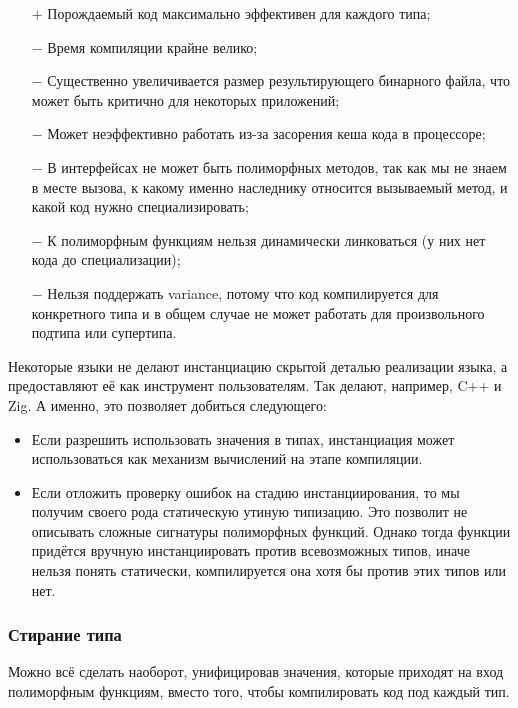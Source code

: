 \documentclass[12pt]{article}
\newcommand{\positive}{$+$} %
\newcommand{\negative}{{\color{red} $-$}} %
\begin{document}
    \begin{itemize}
        \item[\positive] Порождаемый код максимально эффективен для каждого типа;
        \item[\negative] Время компиляции крайне велико;
        \item[\negative] Существенно увеличивается размер результирующего бинарного файла, что может быть критично для некоторых приложений;
        \item[\negative] Может неэффективно работать из-за засорения кеша кода в процессоре;
        \item[\negative] В интерфейсах не может быть полиморфных методов, так как мы не знаем в месте вызова, к какому именно наследнику относится вызываемый метод, и какой код нужно специализировать;
        \item[\negative] К полиморфным функциям нельзя динамически линковаться (у них нет кода до специализации);
        \item[\negative] Нельзя поддержать variance, потому что код компилируется для конкретного типа и в общем случае не может работать для произвольного подтипа или супертипа.
    \end{itemize}

    Некоторые языки не делают инстанциацию скрытой деталью реализации языка, а предоставляют её как инструмент пользователям.
    Так делают, например, C++ и Zig.
    А именно, это позволяет добиться следующего:
    \begin{itemize}
        \item Если разрешить использовать значения в типах, инстанциация может использоваться как механизм вычислений на этапе компиляции.
        \item Если отложить проверку ошибок на стадию инстанциирования, то мы получим своего рода статическую утиную типизацию.
        Это позволит не описывать сложные сигнатуры полиморфных функций.
        Однако тогда функции придётся вручную инстанциировать против всевозможных типов, иначе нельзя понять статически, компилируется она хотя бы против этих типов или нет.
    \end{itemize}

    \subsubsection{Стирание типа} \label{subsubsec:type-erasure}

    Можно всё сделать наоборот, унифицировав значения, которые приходят на вход полиморфным функциям, вместо того, чтобы компилировать код под каждый тип.
\end{document}
